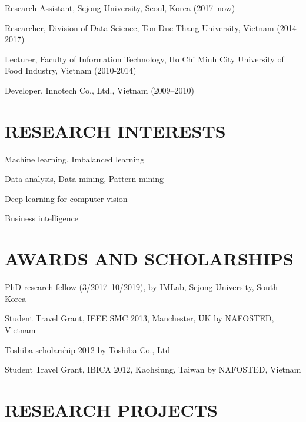 \documentclass[letterpaper]{article}
\renewenvironment{itemize}{
  \begin{list}{}{
    \setlength{\leftmargin}{1.5em}
  }
}{
  \end{list}
}
\begin{document}
\begin{itemize}

\item Research Assistant, Sejong University, Seoul, Korea (2017--now)
\item Researcher, Division of Data Science, Ton Duc Thang University, Vietnam (2014--2017)
\item Lecturer, Faculty of Information Technology, Ho Chi Minh City University of Food Industry, Vietnam (2010-2014)
\item Developer, Innotech Co., Ltd., Vietnam (2009--2010)
\end{itemize}

\section*{RESEARCH INTERESTS}

\begin{itemize}

\item Machine learning, Imbalanced learning
\item Data analysis, Data mining, Pattern mining 
\item Deep learning for computer vision
\item Business intelligence

\end{itemize}


\section*{AWARDS AND SCHOLARSHIPS}

\begin{itemize}

\item PhD research fellow (3/2017--10/2019), by IMLab, Sejong University, South Korea 
\item Student Travel Grant, IEEE SMC 2013, Manchester, UK  by NAFOSTED, Vietnam
\item Toshiba scholarship 2012 by Toshiba Co., Ltd
\item Student Travel Grant, IBICA 2012, Kaohsiung, Taiwan by NAFOSTED, Vietnam

\end{itemize}

\section*{RESEARCH PROJECTS}
\end{document}
